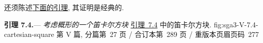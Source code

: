 还须陈述\hyperref[lem:sga3-V-7.4]{下面的引理}, 其证明是经典的.

\medskip
{}\label{lem:sga3-V-7.4}%
\noindent\textbf{引理 7.4.}---%
\emph{考虑概形的一个笛卡尔方块}
  {\hyperref[lem:sga3-V-7.4]{引理~7.4} 中的笛卡尔方块.}
  {fig:sga3-V-7.4-cartesian-square}
  {第 V 篇, 分篇第~27 页 / 合订本第~289 页 / 重版本页眉页码~277}

